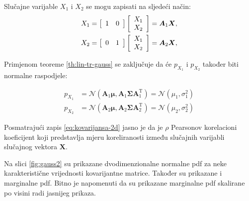 Slučajne varijable $X_1$ i $X_2$ se mogu zapisati na sljedeći način:
\begin{eqnarray}
	X_1 = \left[\begin{array}{cc}1&0\end{array}\right] \left[\begin{array}{c}X_1\\X_2\end{array}\right] = \bm A_1 \bm X,
	\\
	X_2 = \left[\begin{array}{cc}0&1\end{array}\right] \left[\begin{array}{c}X_1\\X_2\end{array}\right] = \bm A_2 \bm X,
\end{eqnarray}

Primjenom teoreme \ref{th:lin-tr-gauss} se zaključuje da će $p_{X_1}$ i
$p_{X_2}$ također biti normalne raspodjele:

\begin{align*}
	p_{X_1} &= \mathcal{N}(\bm A_1\bm\mu, \bm A_1 \bm\Sigma \bm A_1^\mathrm T)
		= \mathcal{N}(\mu_1, \sigma_1^2) \\
	p_{X_2} &= \mathcal{N}(\bm A_2\bm\mu, \bm A_2 \bm\Sigma \bm A_2^\mathrm T)
		= \mathcal{N}(\mu_2, \sigma_2^2)
\end{align*}

Posmatrajući zapis \eqref{eq:kovarijansa-2d} jasno je da je $\rho$ Pearsonov
korelacioni koeficijent koji predstavlja mjeru koreliranosti između slučajnih
varijabli slučajnog vektora $\bm X$.

Na slici \ref{fig:gauss2} su prikazane dvodimenzionalne normalne pdf za neke
karakteristične vrijednosti kovarijantne matrice. Također su prikazane i
marginalne pdf. Bitno je napomenuti da su prikazane marginalne pdf skalirane po
visini radi jasnijeg prikaza.

